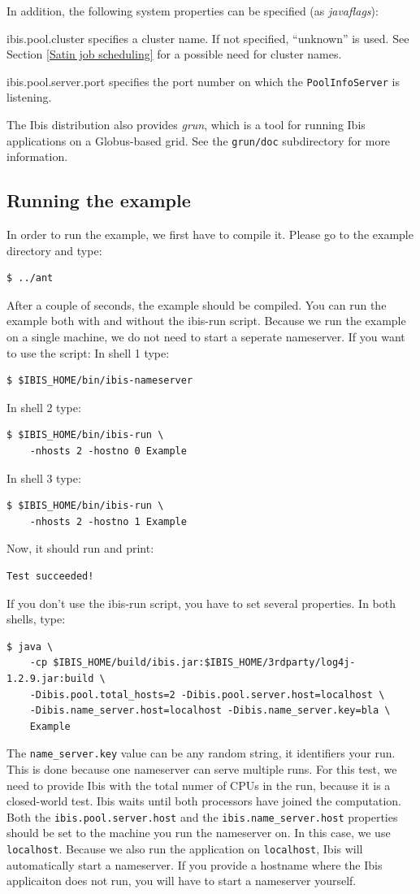 \documentclass[10pt]{article}
\newcommand{\mysubsection}[1]{\subsection{#1}\label{#1}}
\begin{document}
In addition, the following system properties can be specified
(as \emph{javaflags}):
\begin{description}
\item{ibis.pool.cluster}
specifies a cluster name. If not specified,
``unknown'' is used.
See Section \ref{Satin job scheduling} for a possible need for cluster
names.
\item{ibis.pool.server.port}
specifies the port number on which the
\texttt{PoolInfoServer} is listening.
\end{description}

The Ibis distribution also provides \emph{grun}, which is a tool for
running Ibis applications on a Globus-based grid. See the
\texttt{grun/doc} subdirectory for more information.

\mysubsection{Running the example}
In order to run the example, we first have to compile it.
Please go to the example directory and type:
\noindent
\begin{verbatim}
$ ../ant
\end{verbatim}
\noindent
After a couple of seconds, the example should be compiled.
You can run the example both with and without the ibis-run script.
Because we run the example on a single machine, we do not need to start a seperate nameserver.
If you want to use the script:
In shell 1 type:
\begin{verbatim}
$ $IBIS_HOME/bin/ibis-nameserver 
\end{verbatim}
\noindent
In shell 2 type:
\begin{verbatim}
$ $IBIS_HOME/bin/ibis-run \
    -nhosts 2 -hostno 0 Example
\end{verbatim}
\noindent
In shell 3 type:
\begin{verbatim}
$ $IBIS_HOME/bin/ibis-run \
    -nhosts 2 -hostno 1 Example
\end{verbatim}
\noindent
Now, it should run and print:
\begin{verbatim}
Test succeeded!
\end{verbatim}
\noindent
If you don't use the ibis-run script, you have to set several properties.
In both shells, type:
\begin{verbatim}
$ java \
    -cp $IBIS_HOME/build/ibis.jar:$IBIS_HOME/3rdparty/log4j-1.2.9.jar:build \
    -Dibis.pool.total_hosts=2 -Dibis.pool.server.host=localhost \
    -Dibis.name_server.host=localhost -Dibis.name_server.key=bla \
    Example
\end{verbatim}
\noindent
The \texttt{name\_server.key} value can be any random string, it identifiers
your run. This is done because one nameserver can serve multiple
runs. For this test, we need to provide Ibis with the total numer of
CPUs in the run, because it is a closed-world test. Ibis waits until
both processors have joined the computation. Both the
\texttt{ibis.pool.server.host} and the \texttt{ibis.name\_server.host} properties should
be set to the machine you run the nameserver on.  In this case, we use
\texttt{localhost}. Because we also run the application on \texttt{localhost}, Ibis will
automatically start a nameserver. If you provide a hostname where the
Ibis applicaiton does not run, you will have to start a nameserver
yourself.
\end{document}
